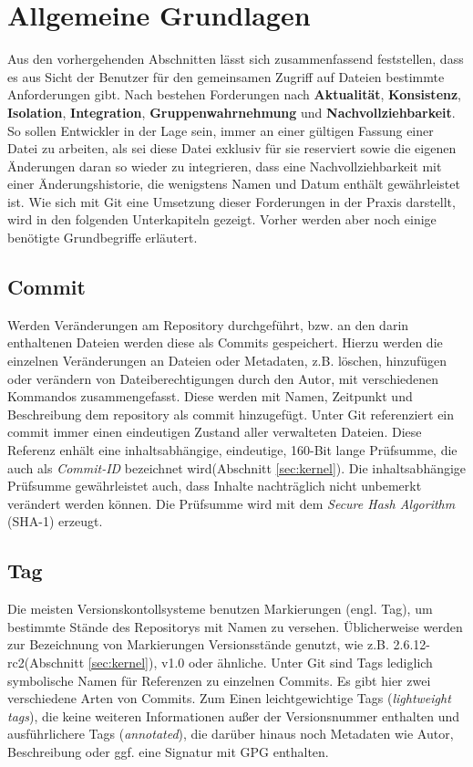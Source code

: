 \section{Allgemeine Grundlagen}\label{sec:Grundlagen}
Aus den vorhergehenden Abschnitten lässt sich zusammenfassend feststellen, dass
es aus Sicht der Benutzer für den gemeinsamen Zugriff auf Dateien bestimmte
Anforderungen gibt. Nach \cite[S.~37]{hagen:1678} bestehen Forderungen nach
\textbf{Aktualität}, \textbf{Konsistenz}, \textbf{Isolation},
\textbf{Integration}, \textbf{Gruppenwahrnehmung} und
\textbf{Nachvollziehbarkeit}. So sollen Entwickler in der Lage sein, immer an
einer gültigen Fassung einer Datei zu arbeiten, als sei diese Datei exklusiv für
sie reserviert sowie die eigenen Änderungen daran so wieder zu integrieren, dass
eine Nachvollziehbarkeit mit einer Änderungshistorie, die wenigstens Namen und
Datum enthält gewährleistet ist. Wie sich mit Git eine Umsetzung dieser
Forderungen in der Praxis darstellt, wird in den folgenden Unterkapiteln
gezeigt. Vorher werden aber noch einige benötigte Grundbegriffe erläutert.

\subsection{Commit}\label{sec:commit}
Werden Veränderungen am Repository durchgeführt, bzw. an den darin enthaltenen
Dateien werden diese als Commits gespeichert. Hierzu werden die einzelnen
Veränderungen an Dateien oder Metadaten, z.B. löschen, hinzufügen oder verändern
von Dateiberechtigungen durch den Autor, mit verschiedenen Kommandos
zusammengefasst. Diese werden mit Namen, Zeitpunkt und Beschreibung dem
\gls{repository} als \gls{commit} hinzugefügt. Unter Git referenziert ein
\gls{commit} immer einen eindeutigen Zustand aller verwalteten Dateien. Diese
Referenz enhält eine inhaltsabhängige, eindeutige, 160-Bit lange Prüfsumme, die
auch als \textit{Commit-ID} bezeichnet wird(Abschnitt \ref{sec:kernel}). Die
inhaltsabhängige Prüfsumme gewährleistet auch, dass Inhalte nachträglich nicht
unbemerkt verändert werden können. Die Prüfsumme wird mit dem \textit{Secure
Hash Algorithm} (\gls{SHA-1}) erzeugt.\cite[S.~20-21]{gitosp}

\subsection{Tag}\label{sec:tag}
Die meisten Versionskontollsysteme benutzen Markierungen (engl. Tag), um
bestimmte Stände des Repositorys mit Namen zu versehen. Üblicherweise werden
zur Bezeichnung von Markierungen Versionsstände genutzt, wie z.B.
2.6.12-rc2(Abschnitt \ref{sec:kernel}), v1.0 oder ähnliche. Unter Git sind Tags
lediglich symbolische Namen für Referenzen zu einzelnen Commits. Es gibt hier
zwei verschiedene Arten von Commits. Zum Einen leichtgewichtige Tags
(\textit{lightweight tags}), die keine weiteren Informationen außer der
Versionsnummer enthalten und ausführlichere Tags (\textit{annotated}), die
darüber hinaus noch Metadaten wie Autor, Beschreibung oder ggf. eine Signatur
mit GPG enthalten.\cite[S.~48]{progit}

